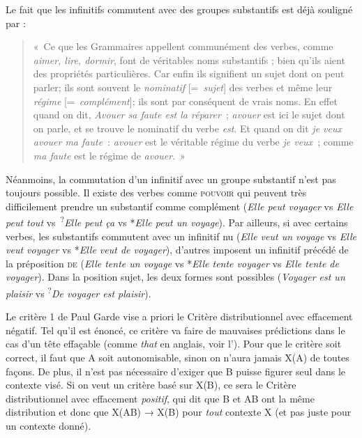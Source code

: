 {     Le fait que les infinitifs commutent avec des groupes substantifs est déjà souligné par \citet[59]{buffier1709grammaire} : 
    \begin{quote}
        «~Ce que les Grammaires appellent communément des verbes, comme \textit{aimer, lire, dormir}, font de véritables noms substantifs ; bien qu’ils aient des propriétés particulières. Car enfin ils signifient un sujet dont on peut parler; ils sont souvent le \textit{nominatif} [=~\textit{sujet}] des verbes et même leur \textit{régime} [=~\textit{complément}]; ils sont par conséquent de vrais noms. En effet quand on dit, \textit{Avouer sa faute est la réparer~}; \textit{avouer} est ici le sujet dont on parle, et se trouve le nominatif du verbe \textit{est}. Et quand on dit \textit{je veux avouer ma faute~}: \textit{avouer} est le véritable régime du verbe \textit{je veux~}; comme \textit{ma faute} est le régime de \textit{avouer}.~»
    \end{quote}

    Néanmoins, la commutation d'un infinitif avec un groupe substantif n’est pas toujours possible. Il existe des verbes comme \textsc{pouvoir} qui peuvent très difficilement prendre un substantif comme complément (\textit{Elle peut voyager} vs \textit{Elle peut tout} vs~\textsuperscript{?}\textit{Elle peut ça} vs *\textit{Elle peut un voyage}). Par ailleurs, si avec certains verbes, les substantifs commutent avec un infinitif nu (\textit{Elle veut un voyage} vs \textit{Elle veut voyager} vs *\textit{Elle veut de voyager}), d’autres imposent un infinitif précédé de la préposition \textsc{de} (\textit{Elle tente un voyage} vs *\textit{Elle tente voyager} vs \textit{Elle tente de voyager}). Dans la position sujet, les deux formes sont possibles (\textit{Voyager est un plaisir} vs \textsuperscript{?}\textit{De voyager est plaisir}).

     Le critère 1 de Paul Garde vise a priori le Critère distributionnel avec effacement négatif. Tel qu'il est énoncé, ce critère va faire de mauvaises prédictions dans le cas d'un tête effaçable (comme \textit{that} en anglais, voir l’). Pour que le critère soit correct, il faut que A soit autonomisable, sinon on n'aura jamais X(A) de toutes façons. De plus, il n'est pas nécessaire d'exiger que B puisse figurer seul dans le contexte visé. Si on veut un critère basé sur X(B), ce sera le Critère distributionnel avec effacement \textit{positif}, qui dit que B et AB ont la même distribution et donc que X(AB) → X(B) pour \textit{tout} contexte X (et pas juste pour un contexte donné).
    
}
